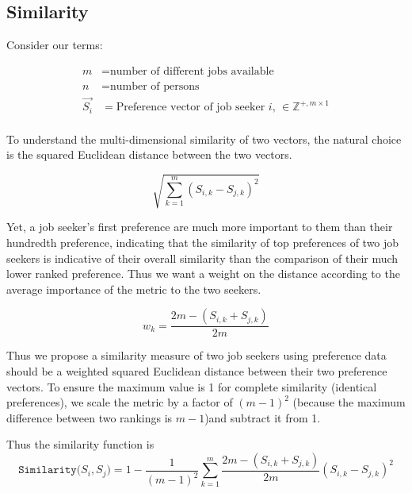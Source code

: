 \subsection{Similarity}

Consider our terms:

\begin{align}
m &= \text{number of different jobs available}\\
n &= \text{number of persons}\\
\vec{S_i} &= \text{Preference vector of job seeker $i$, } \in \mathbb{Z}^{+, m \times 1} \\
\end{align}

To understand the multi-dimensional similarity of two vectors, the natural choice is the squared Euclidean distance between the two vectors. 

\[\sqrt{ \sum_{k=1}^{m} (S_{i,k} - S_{j,k})^2}\]

Yet, a job seeker's first preference are much more important to them than their hundredth preference, indicating that the similarity of top preferences of two job seekers is indicative of their overall similarity than the comparison of their much lower ranked preference.  Thus we want a weight on the distance according to the average importance of the metric to the two seekers.

\[w_k = \frac{2m - (S_{i,k} + S_{j,k})}{2m}\]


Thus we propose a similarity measure of two job seekers using preference data should be a weighted squared Euclidean distance between their two preference vectors. To ensure the maximum value is 1 for complete similarity (identical preferences), we scale the metric by a factor of $(m-1)^2$ (because the maximum difference between two rankings is $m-1$)and subtract it from 1.

Thus the similarity function is
\[\texttt{Similarity}({S_i, S_j)} = 1 - \frac{1}{(m-1)^2}\sum_{k=1}^{m} \frac{2m - (S_{i,k} + S_{j,k})}{2m}(S_{i,k} - S_{j,k})^2\]